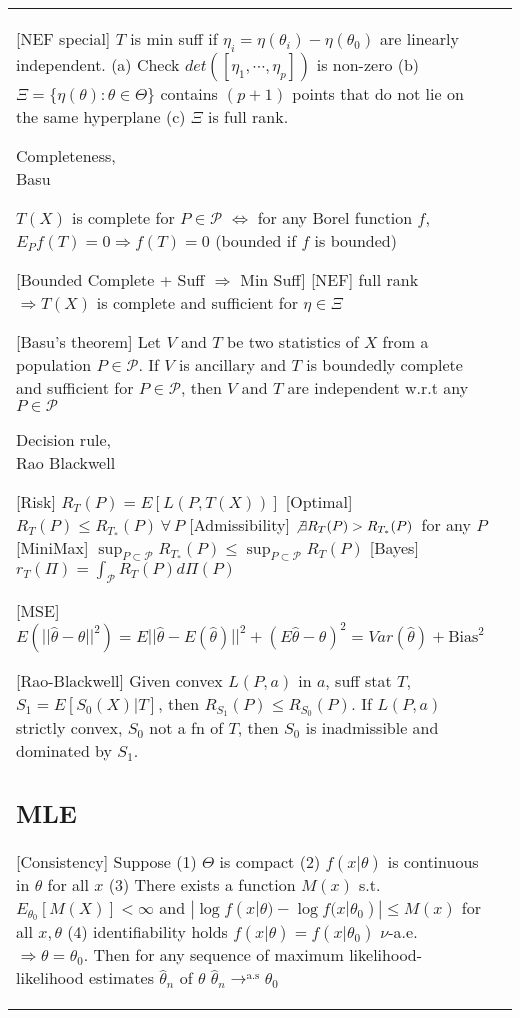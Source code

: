 \begin{tabulary}{\textwidth}{l || L}
	[NEF special]
	$T$ is min suff if $\eta_i=\eta(\theta_i)-\eta(\theta_0)$ are linearly independent.
	(a) Check $det([\eta_1, \cdots, \eta_p])$ is non-zero
	(b) $\Xi = \{\eta(\theta):\theta\in\Theta\}$  contains $(p+1)$ points that do not lie on the same hyperplane
	(c) $\Xi$ is full rank.

	\subsection{Completeness,\\Basu}

	$T(X)$ is complete for $P\in\mathcal{P}$ $\Leftrightarrow$ for any Borel function $f$,
	$E_P f(T)=0 \Rightarrow f(T)=0$ (bounded if $f$ is bounded)

	[Bounded Complete + Suff $\Rightarrow$ Min Suff]
		[NEF]
	full rank $\Rightarrow T(X)$ is complete and sufficient for $\eta\in\Xi$

	[Basu's theorem]
	Let $V$ and $T$ be two statistics of $X$ from a population $P\in\mathcal{P}$. If $V$ is ancillary and $T$ is boundedly complete and sufficient for $P\in\mathcal{P}$, then $V$ and $T$ are independent w.r.t any $P\in\mathcal{P}$

	\subsection{Decision rule,\\Rao Blackwell}

	[Risk] $R_T(P) = E[L(P, T(X))]$
	[Optimal]
	$R_T(P) \leq R_{T_*}(P) \, \forall \, P$
	[Admissibility]
	$\not\exists R_T(P) > R_{T_*}(P) \, $ for any $P$
	[MiniMax]
	$\sup_{P\subset\mathcal{P}}R_{T_*}(P)\leq \sup_{P\subset\mathcal{P}}R_T(P)$
	[Bayes]
	$r_T(\Pi)=\int_{\mathcal{P}} R_T(P) d\Pi(P)$

	[MSE]
	$E(||\hat\theta-\theta||^2)=E||\hat\theta-E(\hat\theta)||^2+(E\hat\theta-\theta)^2=Var(\hat\theta)+\text{Bias}^2$

	[Rao-Blackwell]
	Given convex $L(P, a)$ in $a$, suff stat $T$,
	$S_1 = E[S_0(X)|T]$, then $R_{S_1}(P)\leq R_{S_0}(P)$.
	If $L(P, a)$ strictly convex, $S_0$ not a fn of $T$, then $S_0$ is inadmissible and dominated by $S_1$.

	\subsection{MLE}

	[Consistency]
	Suppose (1) $\Theta$ is compact (2) $f(x|\theta)$ is continuous in $\theta$
	for all $x$ (3) There exists a function $M(x)$ s.t.
	$E_{\theta_0}[M(X)]<\infty$ and $|\log f(x|\theta) - \log
		f(x|\theta_0)| \leq M(x)$ for all $x, \theta$ (4) identifiability holds
	$f(x|\theta)=f(x|\theta_0)$ $\nu$-a.e. $\Rightarrow \theta = \theta_0$.
	Then for any sequence of maximum likelihood-likelihood estimates
	$\hat\theta_n$ of $\theta$
	$
		\hat\theta_n \rightarrow^{\text{a.s}} \theta_0
	$




\end{tabulary}
